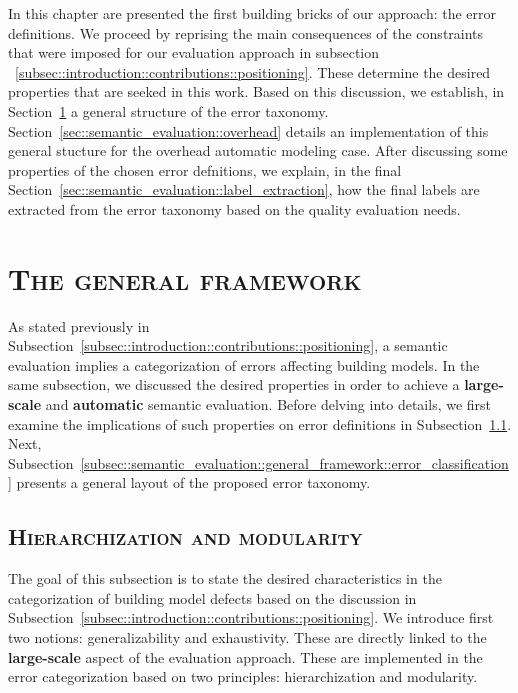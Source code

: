 \minitoc

\vfill

In this chapter are presented the first building bricks of our approach: the error definitions.
We proceed by reprising the main consequences of the constraints that were imposed for our evaluation approach in subsection ~\ref{subsec::introduction::contributions::positioning}.
These determine the desired properties that are seeked in this work.
Based on this discussion, we establish, in Section~\ref{sec::semantic_evaluation::general_framework} a general structure of the error taxonomy.
Section~\ref{sec::semantic_evaluation::overhead} details an implementation of this general stucture for the overhead automatic modeling case.
After discussing some properties of the chosen error defnitions, we explain, in the final Section~\ref{sec::semantic_evaluation::label_extraction}, how the final labels are extracted from the error taxonomy based on the quality evaluation needs.

\clearpage

\section{\textsc{The general framework}}
    \label{sec::semantic_evaluation::general_framework}
    As stated previously in Subsection~\ref{subsec::introduction::contributions::positioning}, a semantic evaluation implies a categorization of errors affecting building models.
    In the same subsection, we discussed the desired properties in order to achieve a \textbf{large-scale} and \textbf{automatic} semantic evaluation.
    Before delving into details, we first examine the implications of such properties on error definitions in Subsection~\ref{subsec::semantic_evaluation::general_framework::hierarchization_moderularity}.
    Next, Subsection~\ref{subsec::semantic_evaluation::general_framework::error_classification} presents a general layout of the proposed error taxonomy.

    \subsection{\textsc{Hierarchization and modularity}}
        \label{subsec::semantic_evaluation::general_framework::hierarchization_moderularity}
        The goal of this subsection is to state the desired characteristics in the categorization of building model defects based on the discussion in Subsection~\ref{subsec::introduction::contributions::positioning}.
        We introduce first two notions: generalizability and exhaustivity.
        These are directly linked to the \textbf{large-scale} aspect of the evaluation approach.
        These are implemented in the error categorization based on two principles: hierarchization and modularity.

